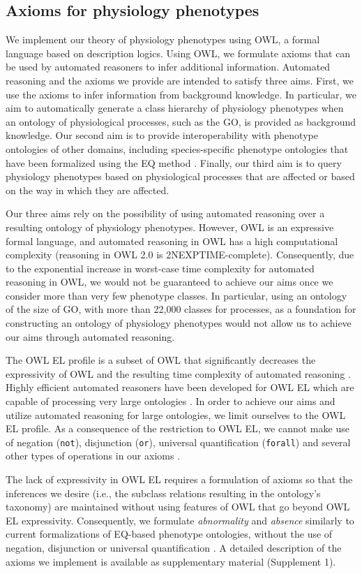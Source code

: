 \documentclass{bioinfo}
\renewcommand{\cite}{\citep}
\begin{document}
\begin{methods}
\subsection{Axioms for physiology phenotypes}
We implement our theory of physiology phenotypes using OWL, a formal
language based on description logics. Using OWL, we formulate axioms
that can be used by automated reasoners to infer additional
information. Automated reasoning and the axioms we provide are
intended to satisfy three aims. First, we use the axioms to infer
information from background knowledge. In particular, we aim to
automatically generate a class hierarchy of physiology phenotypes when
an ontology of physiological processes, such as the GO, is provided as
background knowledge. Our second aim is to provide interoperability
with phenotype ontologies of other domains, including species-specific
phenotype ontologies that have been formalized using the EQ method
\cite{Mungall2010, Gkoutos2005}. Finally, our third aim is to query
physiology phenotypes based on physiological processes that are
affected or based on the way in which they are affected. 

Our three aims rely on the possibility of using automated reasoning
over a resulting ontology of physiology phenotypes.  However, OWL is
an expressive formal language, and automated reasoning in OWL has a
high computational complexity (reasoning in OWL 2.0 is
2NEXPTIME-complete). Consequently, due to the exponential increase in
worst-case time complexity for automated reasoning in OWL, we would
not be guaranteed to achieve our aims once we consider more than very
few phenotype classes. In particular, using an ontology of the size of
GO, with more than 22,000 classes for processes, as a foundation for
constructing an ontology of physiology phenotypes would not allow us
to achieve our aims through automated reasoning.

The OWL EL profile is a subset of OWL that significantly decreases the
expressivity of OWL and the resulting time complexity of automated
reasoning \cite{owlprofiles}. Highly efficient automated reasoners
have been developed for OWL EL which are capable of processing very
large ontologies \cite{Kazakov2011}. In order to achieve our aims and
utilize automated reasoning for large ontologies, we limit ourselves
to the OWL EL profile. As a consequence of the restriction to OWL EL,
we cannot make use of negation ({\tt not}), disjunction ({\tt or}),
universal quantification ({\tt forall}) and several other types of
operations in our axioms \cite{owlprofiles}.

The lack of expressivity in OWL EL requires a formulation of axioms so
that the inferences we desire (i.e., the subclass relations resulting
in the ontology's taxonomy) are maintained without using features of
OWL that go beyond OWL EL expressivity. Consequently, we formulate
{\em abnormality} and {\em absence} similarly to current
formalizations of EQ-based phenotype ontologies, without the use of
negation, disjunction or universal quantification
\cite{Mungall2010}. A detailed description of the axioms we implement
is available as supplementary material (Supplement 1).
\end{methods}
\end{document}
